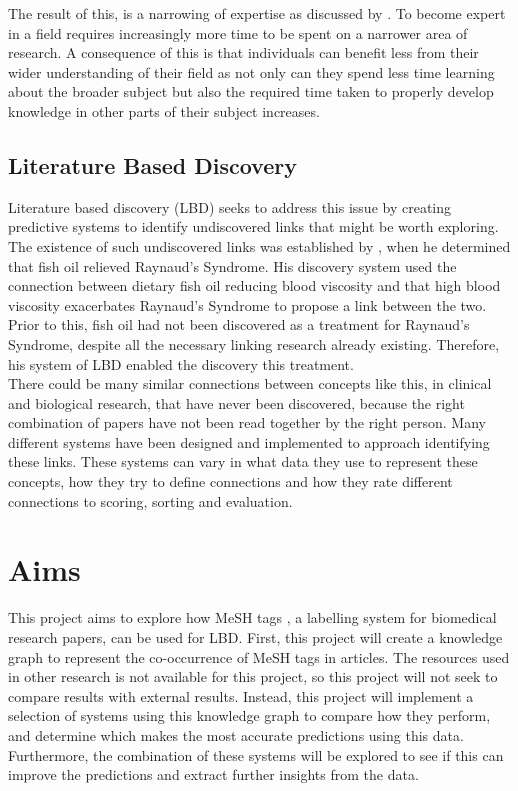 \documentclass{l4proj}
\begin{document}
The result of this, is a narrowing of expertise as discussed by \cite{swanson_fish_1986}. To become expert in a field requires increasingly more time to be spent on a narrower area of research. A consequence of this is that individuals can benefit less from their wider understanding of their field as not only can they spend less time learning about the broader subject but also the required time taken to properly develop knowledge in other parts of their subject increases.\\ 

\subsection{Literature Based Discovery}

Literature based discovery (LBD) seeks to address this issue by creating predictive systems to identify undiscovered links that might be worth exploring. The existence of such undiscovered links was established by \cite{swanson_fish_1986}, when he determined that fish oil relieved Raynaud's Syndrome. His discovery system used the connection between dietary fish oil reducing blood viscosity and that high blood viscosity exacerbates Raynaud's Syndrome to propose a link between the two. Prior to this, fish oil had not been discovered as a treatment for Raynaud's Syndrome, despite all the necessary linking research already existing. Therefore, his system of LBD enabled the discovery this treatment. \\

There could be many similar connections between concepts like this, in clinical and biological research, that have never been discovered, because the right combination of papers have not been read together by the right person. Many different systems have been designed and implemented to approach identifying these links. These systems can vary in what data they use to represent these concepts, how they try to define connections and how they rate different connections to scoring, sorting and evaluation. \\

\section{Aims}

This project aims to explore how MeSH tags \citep{mesh_home}, a labelling system for biomedical research papers, can be used for LBD. First, this project will create a knowledge graph to represent the co-occurrence of MeSH tags in articles. The resources used in other research is not available for this project, so this project will not seek to compare results with external results. Instead, this project will implement a selection of systems using this knowledge graph to compare how they perform, and determine which makes the most accurate predictions using this data. Furthermore, the combination of these systems will be explored to see if this can improve the predictions and extract further insights from the data. \\ 
\end{document}
